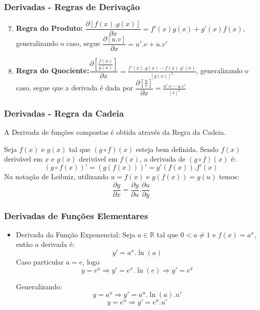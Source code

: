 \documentclass[hyperref={pdfpagelabels=false}]{beamer}
\begin{document}
\begin{frame}
\frametitle{Derivadas - Regras de Derivação}

    \begin{enumerate} \setcounter{enumi}{6}
    \item {\bf Regra do Produto:} $\dfrac{\partial [f(x).g(x)]}{\partial x} = f'(x)g(x)+g'(x)f(x)$, generalizando o caso, segue $\dfrac{\partial [u.v]}{\partial x} = u'.v+u.v'$ \pause
    \item {\bf Regra do Quociente:}$\dfrac{\partial [\frac{f(x)}{g(x)}]}{\partial x} = \frac{f'(x).g(x) - f(x).g'(x)}{[g(x)]^2}$, generalizando o caso, segue que a derivada é dada por $\dfrac{\partial [\displaystyle \frac{u}{v}]}{\partial x} = \displaystyle \frac{u'.v-u.v'}{[v]^2}$ 
    \end{enumerate}


\end{frame}

\begin{frame}
\frametitle{Derivadas - Regra da Cadeia}

A Derivada de funções compostas é obtida através da Regra da Cadeia.

\begin{theorem}
	Seja $f(x)$ e $g(x)$ tal que $(g \circ f)(x)$ esteja bem definida. Sendo $f(x)$ derivável em $x$ e $g(x)$ derivável em $f(x)$, a derivada de $(g \circ f)(x)$ é:
	\begin{equation}
	(g \circ f(x))' = (g(f(x)))' = g'(f(x)).f'(x)
	\end{equation}
	Na notação de Leibniz, utilizando $u = f(x)$ e $g(f(x))=g(u)$ temos:
	\begin{equation}
	\dfrac{\partial y}{\partial x} = \dfrac{\partial y}{\partial u} . \dfrac{\partial u}{\partial y}
	\end{equation}
\end{theorem}

\end{frame}

\begin{frame}
\frametitle{Derivadas de Funções Elementares}
\begin{itemize}
 \item Derivada da Função Exponencial: \pause Seja $a \in \mathbb{R}$ tal que $0 < a \neq 1$ e $f(x) = a^x$, então a derivada é: $$y' = a^x .\ln(a)$$ \pause
 Caso particular $a = e$, logo $$ y = e^x \Rightarrow y' = e^x .\ln(e) \Rightarrow y' = e^x $$ \pause


Generalizando: $$y = a^u \Rightarrow y' = a^u.\ln(a).u'$$ $$y = e^u \Rightarrow y' = e^u.u'$$
\end{itemize}


\end{frame}
\end{document}
